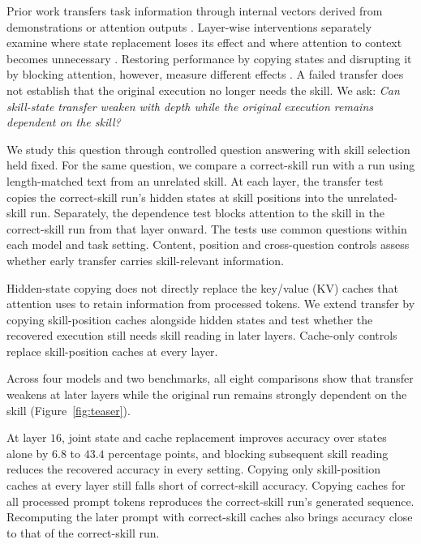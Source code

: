 Prior work transfers task information through internal vectors derived
from demonstrations or attention outputs
\citep{hendel2023taskvectors,todd2024functionvectors}. Layer-wise
interventions separately examine where state replacement loses its
effect and where attention to context becomes unnecessary
\citep{onset2025instruction,sia2024incontexttranslation}. Restoring
performance by copying states and disrupting it by blocking attention,
however, measure different effects \citep{heimersheim2024patching}.
A failed transfer does not establish that the original execution no
longer needs the skill. We ask: \emph{Can skill-state transfer weaken with
depth while the original execution remains dependent on the skill?}

We study this question through controlled question answering with skill
selection held fixed. For the same question, we compare a correct-skill
run with a run using length-matched text from an unrelated skill.
At each layer, the transfer test copies the correct-skill run's hidden
states at skill positions into the unrelated-skill run. Separately, the dependence test blocks
attention to the skill in the correct-skill run from that layer onward.
The tests use common questions within each model and task setting.
Content, position and cross-question controls assess whether early
transfer carries skill-relevant information.

Hidden-state copying does not directly replace the key/value (KV) caches
that attention uses to retain information from processed tokens.
We extend transfer by copying skill-position caches alongside hidden
states and test whether the recovered execution still needs skill
reading in later layers. Cache-only controls replace skill-position
caches at every layer.

Across four models and two benchmarks, all eight comparisons show that
transfer weakens at later layers while the original run remains strongly
dependent on the skill (Figure~\ref{fig:teaser}).

At layer $16$, joint state and cache replacement improves accuracy over states alone by $6.8$
to $43.4$ percentage points, and blocking subsequent skill reading
reduces the recovered accuracy in every setting. Copying only
skill-position caches at every layer still falls short of correct-skill
accuracy. Copying caches for all processed prompt tokens reproduces the
correct-skill run's generated sequence. Recomputing the later prompt
with correct-skill caches also brings accuracy close to that of the
correct-skill run.

